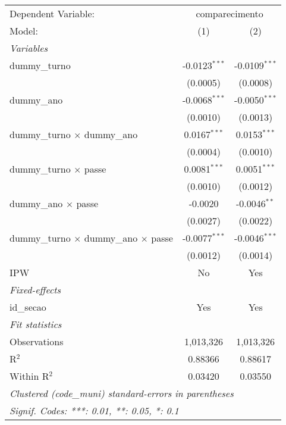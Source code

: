 
\begin{tabular}{lcc}
   \tabularnewline\midrule\midrule
   Dependent Variable: & \multicolumn{2}{c}{comparecimento}\\
   Model:                                              & (1)             & (2)\\
   \midrule \emph{Variables} &   &  \\
   dummy\_turno                                       & -0.0123$^{***}$ & -0.0109$^{***}$\\
                                                       & (0.0005)        & (0.0008)\\
   dummy\_ano                                         & -0.0068$^{***}$ & -0.0050$^{***}$\\
                                                       & (0.0010)        & (0.0013)\\
   dummy\_turno $\times$ dummy\_ano                 & 0.0167$^{***}$  & 0.0153$^{***}$\\
                                                       & (0.0004)        & (0.0010)\\
   dummy\_turno $\times$ passe                       & 0.0081$^{***}$  & 0.0051$^{***}$\\
                                                       & (0.0010)        & (0.0012)\\
   dummy\_ano $\times$ passe                         & -0.0020         & -0.0046$^{**}$\\
                                                       & (0.0027)        & (0.0022)\\
   dummy\_turno $\times$ dummy\_ano $\times$ passe & -0.0077$^{***}$ & -0.0046$^{***}$\\
                                                       & (0.0012)        & (0.0014)\\
   IPW                                                 & No              & Yes\\
   \midrule \emph{Fixed-effects} &   &  \\
   id\_secao                                          & Yes             & Yes\\
   \midrule \emph{Fit statistics} &   &  \\
   Observations                                        & 1,013,326       & 1,013,326\\
   R$^2$                                               & 0.88366         & 0.88617\\
   Within R$^2$                                        & 0.03420         & 0.03550\\
   \midrule\midrule\multicolumn{3}{l}{\emph{Clustered (code\_muni) standard-errors in parentheses}}\\
   \multicolumn{3}{l}{\emph{Signif. Codes: ***: 0.01, **: 0.05, *: 0.1}}\\
\end{tabular}



